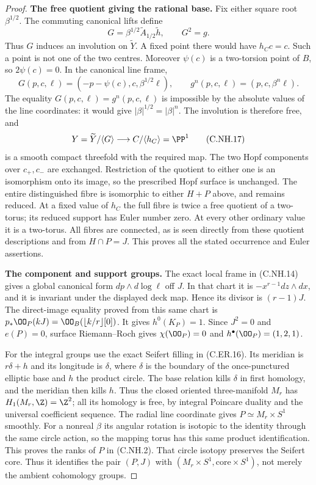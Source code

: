 \begin{proof}
\par\medskip\noindent\textbf{The free quotient giving the rational base.}
Fix either square root $\beta^{1/2}$. The commuting
canonical lifts define
\[
           G=\beta^{1/2}\widetilde A_{1/2}\widetilde h,
                    \qquad G^2=g.
                                                        \tag{C.NH.15}
\]
Thus $G$ induces an involution on $\widetilde Y$. A fixed
point there would have $h_Cc=c$. Such a point is not one
of the two centres. Moreover $\psi(c)$ is a two-torsion
point of $B$, so $2\psi(c)=0$. In the canonical line frame,
\[
 G(p,c,\ell)=(-p-\psi(c),c,\beta^{1/2}\ell),
 \qquad g^n(p,c,\ell)=(p,c,\beta^n\ell).
                                                        \tag{C.NH.16}
\]
The equality $G(p,c,\ell)=g^n(p,c,\ell)$ is impossible by
the absolute values of the line coordinates: it would
give $|\beta|^{1/2}=|\beta|^n$. The involution is therefore
free, and
\[
                 Y=\widetilde Y/\langle G\rangle
                  \longrightarrow C/\langle h_C\rangle=\PP^1
                                                        \tag{C.NH.17}
\]
is a smooth compact threefold with the required map.
The two Hopf components over $c_+,c_-$ are exchanged.
Restriction of the quotient to either one is an
isomorphism onto its image, so the prescribed Hopf
surface is unchanged. The entire distinguished fibre is
isomorphic to either $H+P$ above, and remains reduced.
At a fixed value of $h_C$ the full fibre is twice a free
quotient of a two-torus; its reduced support has Euler
number zero. At every other ordinary value it is a
two-torus. All fibres are connected, as is seen directly
from these quotient descriptions and from $H\cap P=J$.
This proves all the stated occurrence and Euler assertions.

\par\medskip\noindent\textbf{The component and support groups.}
The exact local frame in (C.NH.14) gives a global canonical
form $dp\wedge d\log\ell$ off $J$. In that chart it is
$-x^{r-1}dz\wedge dx$, and it is invariant under the
displayed deck map. Hence its divisor is $(r-1)J$.
The direct-image equality proved from this same chart is
$p_*\OO_P(kJ)=\OO_B(\lfloor k/r\rfloor[0])$.
It gives $h^0(K_P)=1$. Since $J^2=0$ and $e(P)=0$,
surface Riemann--Roch gives $\chi(\OO_P)=0$ and
$h^\bullet(\OO_P)=(1,2,1)$.

For the integral groups use the exact Seifert filling in
(C.ER.16). Its meridian is $r\delta+h$ and its longitude
is $\delta$, where $\delta$ is the boundary of the
once-punctured elliptic base and $h$ the product circle.
The base relation kills $\delta$ in first homology, and
the meridian then kills $h$. Thus the closed oriented
three-manifold $M_r$ has $H_1(M_r,\Z)=\Z^2$; all its
homology is free, by integral Poincare duality and the
universal coefficient sequence. The radial line coordinate
gives $P\simeq M_r\times S^1$ smoothly. For a nonreal
$\beta$ its angular rotation is isotopic to the identity
through the same circle action, so the mapping torus has
this same product identification. This proves the ranks
of $P$ in (C.NH.2).
That circle isotopy preserves the Seifert core. Thus it
identifies the pair $(P,J)$ with
$(M_r\times S^1,\mathrm{core}\times S^1)$, not merely
the ambient cohomology groups.


\end{proof}
